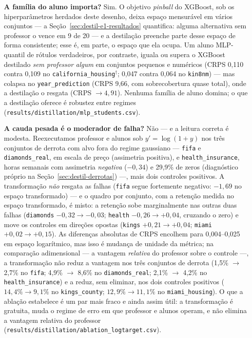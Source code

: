 \textbf{A família do aluno importa?} Sim. O objetivo \emph{pinball}
do XGBoost, sob os hiperparâmetros herdados deste desenho, deixa
espaço mensurável em vários conjuntos --- a
Seção~\ref{sec:destil-e1-resultados} quantifica: alguma alternativa
sem professor o vence em 9 de 20 --- e a destilação preenche parte
desse espaço de forma consistente; esse é, em parte, o espaço que ela
ocupa. Um aluno MLP-quantil de rótulos verdadeiros, por contraste,
iguala ou supera o XGBoost destilado \emph{sem professor algum} em conjuntos
pequenos e numéricos (CRPS 0,110 contra 0,109 no
\texttt{california\_\allowbreak housing}$^\dagger$; 0,047 contra
0,064 no \texttt{kin8nm})
--- mas colapsa no \texttt{year\_\allowbreak prediction} (CRPS 9,66, com
sobrecobertura quase total), onde a destilação o resgata (CRPS
$\to 4{,}91$). Nenhuma família de aluno domina; o que a destilação
oferece é robustez entre regimes
(\texttt{results/\allowbreak distillation/\allowbreak mlp\_\allowbreak students.\allowbreak csv}).

\textbf{A cauda pesada é o moderador de falha?} Não --- e a leitura
correta é modesta.
Reexecutamos professor e alunos sob
$y' = \log(1+y)$ nos três conjuntos de derrota com alvo fora do
regime gaussiano
--- \texttt{fifa} e \texttt{diamonds\_\allowbreak real}, em escala
de preço (assimetria positiva), e
\texttt{health\_\allowbreak insurance}, horas semanais com
assimetria \emph{negativa} ($-0{,}34$) e
29,9\% de zeros (diagnóstico próprio na
Seção~\ref{sec:destil-derrotas}) ---, mais
dois controles positivos. A transformação \emph{não} resgata as
falhas (\texttt{fifa} segue fortemente negativo: $-1{,}69$ no
espaço transformado) --- e o quadro por
conjunto, com a retenção medida no espaço transformado, é misto: a
retenção sobe marginalmente nas outras duas falhas
(\texttt{diamonds} $-0{,}32 \to -0{,}03$; \texttt{health}
$-0{,}26 \to +0{,}04$, cruzando o zero) e move os controles em
direções opostas (\texttt{kings} $+0{,}21 \to +0{,}04$;
\texttt{miami} $+0{,}02 \to +0{,}15$). As diferenças absolutas
de CRPS encolhem para 0,004--0,025 em espaço logarítmico, mas isso é
mudança de unidade da métrica; na comparação adimensional --- a
vantagem \emph{relativa} do
professor sobre o controle ---, a transformação não reduz a vantagem
nos três conjuntos de derrota
(1,5\% $\to$ 2,7\% no \texttt{fifa}; 4,9\% $\to$ 8,6\% no
\texttt{diamonds\_\allowbreak real}; 2,1\% $\to$ 4,2\% no
\texttt{health\_\allowbreak insurance}) e a reduz, sem eliminar, nos dois
controles positivos ($14{,}4\%\!\to\!9{,}1\%$ no
\texttt{kings\_\allowbreak county}; $12{,}9\%\!\to\!11{,}1\%$ no
\texttt{miami\_\allowbreak housing}). O que a ablação estabelece é
um par mais fraco e
ainda assim útil: a transformação é gratuita, muda o regime de erro
em que professor e alunos operam, e não elimina a vantagem relativa
do professor
(\texttt{results/\allowbreak distillation/\allowbreak ablation\_\allowbreak logtarget.\allowbreak csv}).

